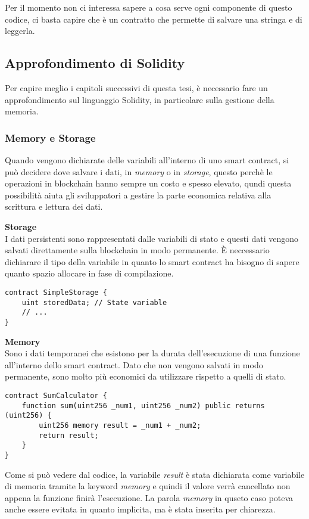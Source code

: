 Per il momento non ci interessa sapere a  cosa serve ogni componente di questo 
codice, ci basta capire che è un contratto che permette di salvare una stringa
e di leggerla. 

\subsection{Approfondimento di Solidity}
Per capire meglio i capitoli successivi di questa tesi, è necessario fare un
approfondimento sul linguaggio Solidity, in particolare sulla gestione della 
memoria.

\subsubsection{Memory e Storage}
Quando vengono dichiarate delle variabili all'interno di uno smart contract, si
può decidere dove salvare i dati, in \textit{memory} o in \textit{storage}, 
questo perchè le operazioni in blockchain hanno sempre un costo e spesso elevato,
qundi questa possibilità aiuta gli sviluppatori a gestire la parte economica
relativa alla scrittura e lettura dei dati. 

\textbf{Storage} \\
I dati persistenti sono rappresentati dalle variabili di stato e questi dati
vengono salvati direttamente sulla blockchain in modo permanente. È neccessario
dichiarare il tipo della variabile in quanto lo smart contract ha bisogno
di sapere quanto spazio allocare in fase di compilazione.
\begin{lstlisting}[language=Solidity]
contract SimpleStorage {
    uint storedData; // State variable
    // ...
}
\end{lstlisting}

\textbf{Memory} \\
Sono i dati temporanei che esistono per la durata dell'esecuzione di una
funzione all'interno dello smart contract. Dato che non vengono salvati in modo
permanente, sono molto più economici da utilizzare rispetto a quelli di stato.

\begin{lstlisting}[language=Solidity]
contract SumCalculator {
    function sum(uint256 _num1, uint256 _num2) public returns (uint256) {
        uint256 memory result = _num1 + _num2;
        return result;
    }
}
\end{lstlisting}

Come si può vedere dal codice, la variabile \textit{result} è stata dichiarata
come variabile di memoria tramite la keyword \textit{memory} e quindi il valore
verrà cancellato non appena la funzione finirà l'esecuzione. 
La parola \textit{memory} in quseto caso poteva anche essere evitata in quanto 
implicita, ma è stata inserita per chiarezza. 

